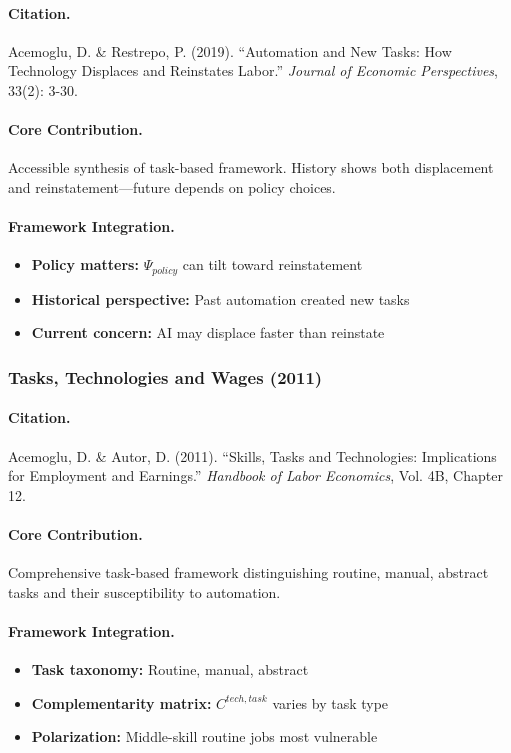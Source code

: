 \paragraph{Citation.}
Acemoglu, D. \& Restrepo, P. (2019).
``Automation and New Tasks: How Technology Displaces and Reinstates Labor.''
\emph{Journal of Economic Perspectives}, 33(2): 3-30.

\paragraph{Core Contribution.}
Accessible synthesis of task-based framework. History shows both
displacement and reinstatement---future depends on policy choices.

\paragraph{Framework Integration.}
\begin{itemize}
  \item \textbf{Policy matters:} $\Psi_{policy}$ can tilt toward reinstatement
  \item \textbf{Historical perspective:} Past automation created new tasks
  \item \textbf{Current concern:} AI may displace faster than reinstate
\end{itemize}

\subsubsection{Tasks, Technologies and Wages (2011)}

\paragraph{Citation.}
Acemoglu, D. \& Autor, D. (2011).
``Skills, Tasks and Technologies: Implications for Employment and Earnings.''
\emph{Handbook of Labor Economics}, Vol. 4B, Chapter 12.

\paragraph{Core Contribution.}
Comprehensive task-based framework distinguishing routine, manual,
abstract tasks and their susceptibility to automation.

\paragraph{Framework Integration.}
\begin{itemize}
  \item \textbf{Task taxonomy:} Routine, manual, abstract
  \item \textbf{Complementarity matrix:} $C^{tech,task}$ varies by task type
  \item \textbf{Polarization:} Middle-skill routine jobs most vulnerable
\end{itemize}

